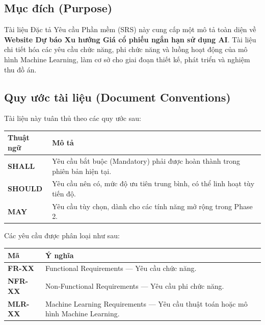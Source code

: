 \documentclass[12pt, a4paper]{article}
\begin{document}
\subsection{Mục đích (Purpose)}
Tài liệu Đặc tả Yêu cầu Phần mềm (SRS) này cung cấp một mô tả toàn diện về \textbf{Website Dự báo Xu hướng Giá cổ phiếu ngắn hạn sử dụng AI}. Tài liệu chi tiết hóa các yêu cầu chức năng, phi chức năng và luồng hoạt động của mô hình Machine Learning, làm cơ sở cho giai đoạn thiết kế, phát triển và nghiệm thu đồ án.

\subsection{Quy ước tài liệu (Document Conventions)}
\noindent Tài liệu này tuân thủ theo các quy ước sau:
\begin{table}[htbp]
    \centering
    \renewcommand{\arraystretch}{1.3}
    \begin{tabularx}{\textwidth}{|l|X|}
        \hline
        \rowcolor{cyan!10}
        \textbf{Thuật ngữ} & \textbf{Mô tả}                                                              \\
        \hline
        \textbf{SHALL}     & Yêu cầu bắt buộc (Mandatory) phải được hoàn thành trong phiên bản hiện tại. \\
        \hline
        \textbf{SHOULD}    & Yêu cầu nên có, mức độ ưu tiên trung bình, có thể linh hoạt tùy tiến độ.    \\
        \hline
        \textbf{MAY}       & Yêu cầu tùy chọn, dành cho các tính năng mở rộng trong Phase 2.             \\
        \hline
    \end{tabularx}
\end{table}

\noindent Các yêu cầu được phân loại như sau:
\begin{table}[htbp]
    \centering
    \renewcommand{\arraystretch}{1.2}
    \small
    \begin{tabularx}{\textwidth}{|l|X|}
        \hline
        \rowcolor{gray!20}
        \textbf{Mã} & \textbf{Ý nghĩa}                                                                  \\
        \hline

        \textbf{FR-XX}
                    & Functional Requirements — Yêu cầu chức năng.                                      \\
        \hline

        \textbf{NFR-XX}
                    & Non-Functional Requirements — Yêu cầu phi chức năng.                              \\
        \hline

        \textbf{MLR-XX}
                    & Machine Learning Requirements — Yêu cầu thuật toán hoặc mô hình Machine Learning. \\
        \hline
    \end{tabularx}
\end{table}
\end{document}
